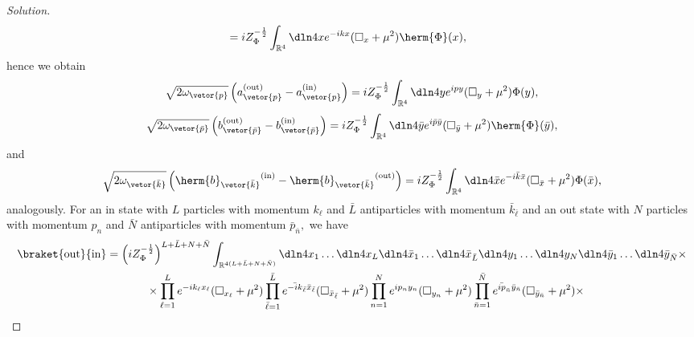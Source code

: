 \begin{proof}[Solution]
\begin{align*}
      &= iZ_{\Phi}^{-\frac12} \int_{\mathbb{R}^4} \dln4x e^{-ikx} (\square_{x} + \mu^2) \herm{\Phi}(x),
   \end{align*}
   hence we obtain
   \begin{equation*}
      \sqrt{2 \omega_{\vetor{p}}} \left(a^{(\mathrm{out})}_{\vetor{p}} - a^{(\mathrm{in})}_{\vetor{p}}\right) = i Z_{\Phi}^{-\frac12} \int_{\mathbb{R}^4} \dln4y e^{ipy} (\square_{y} + \mu^2) \Phi(y),
   \end{equation*}
   \begin{equation*}
      \sqrt{2 \omega_{\vetor{\bar{p}}}} \left(b^{(\mathrm{out})}_{\vetor{\bar{p}}} - b^{(\mathrm{in})}_{\vetor{\bar{p}}}\right) = i Z_{\Phi}^{-\frac12} \int_{\mathbb{R}^4} \dln4{\bar{y}}e^{i\bar{p}\bar{y}} (\square_{\bar{y}} + \mu^2) \herm{\Phi}(\bar{y}),
   \end{equation*}
   and
   \begin{equation*}
      \sqrt{2 \omega_{\vetor{\bar{k}}}} \left({\herm{b}_{\vetor{\bar{k}}}}^{(\mathrm{in})} - {\herm{b}_{\vetor{\bar{k}}}}^{(\mathrm{out})}\right) = i Z_{\Phi}^{-\frac12} \int_{\mathbb{R}^4} \dln4{\bar{x}} e^{-i\bar{k} \bar{x}} (\square_{\bar{x}} + \mu^2) \Phi(\bar{x}),
   \end{equation*}
   analogously. For an in state with \(L\) particles with momentum \(k_\ell\) and \(\bar{L}\) antiparticles with momentum \(\bar{k}_{\bar{\ell}}\) and an out state with \(N\) particles with momentum \(p_n\) and \(\bar{N}\) antiparticles with momentum \(\bar{p}_{\bar{n}},\) we have
   \begin{align*}
      \braket{\mathrm{out}}{\mathrm{in}} &= \left(iZ_\Phi^{-\frac12}\right)^{L + \bar{L} + N + \bar{N}} \int_{\mathbb{R}^{4(L + \bar{L} + N + \bar{N})}} \dln4{x_1} \dots \dln4{x_L} \dln4{\bar{x}_1} \dots \dln4{\bar{x}_{\bar{L}}} \dln4{y_1} \dots \dln4{y_N} \dln4{\bar{y}_1} \dots \dln4{\bar{y}_{\bar{N}}} \times\\
                                         &{}\phantom{\left(iZ_\Phi^{-\frac12}\right)}\times 
                                         \prod_{\ell = 1}^{L} e^{-ik_\ell x_\ell} (\square_{x_\ell} + \mu^2) 
                                         \prod_{\bar{\ell} = 1}^{\bar{L}}e^{\bar{-ik}_{\bar{\ell}} \bar{x}_{\bar{\ell}}} (\square_{\bar{x}_{\bar{\ell}}} + \mu^2) 
                                         \prod_{n = 1}^{N} e^{ip_n y_n} (\square_{y_n} + \mu^2) 
                                         \prod_{\bar{n} = 1}^{\bar{N}} e^{\bar{ip}_{\bar{n}} \bar{y}_{\bar{n}}} (\square_{\bar{y}_{\bar{n}}} + \mu^2) \times\\

\end{align*}
\end{proof}
